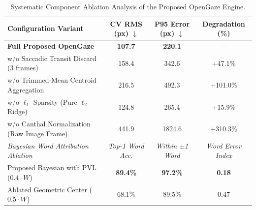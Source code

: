 \begin{table}[t]
\centering
\caption{Systematic Component Ablation Analysis of the Proposed OpenGaze Engine.}
\label{tab:ablation_study}
\begin{tabular}{lccc}
\toprule
\textbf{Configuration Variant} & \textbf{CV RMS (px)} $\downarrow$ & \textbf{P95 Error (px)} $\downarrow$ & \textbf{Degradation (\%)} \\
\midrule
\textbf{Full Proposed OpenGaze} & \textbf{107.7} & \textbf{220.1} & --- \\
w/o Saccadic Transit Discard (3 frames) & 158.4 & 342.6 & +47.1\% \\
w/o Trimmed-Mean Centroid Aggregation & 216.5 & 492.3 & +101.0\% \\
w/o $\ell_1$ Sparsity (Pure $\ell_2$ Ridge) & 124.8 & 265.4 & +15.9\% \\
w/o Canthal Normalization (Raw Image Frame) & 441.9 & 1824.6 & +310.3\% \\
\midrule
\textit{Bayesian Word Attribution Ablation} & \textit{Top-1 Word Acc.} & \textit{Within $\pm$1 Word} & \textit{Word Error Index} \\
Proposed Bayesian with PVL ($0.4 \cdot W$) & \textbf{89.4\%} & \textbf{97.2\%} & \textbf{0.18} \\
Ablated Geometric Center ($0.5 \cdot W$) & 68.1\% & 89.5\% & 0.47 \\
\bottomrule
\end{tabular}
\end{table}
